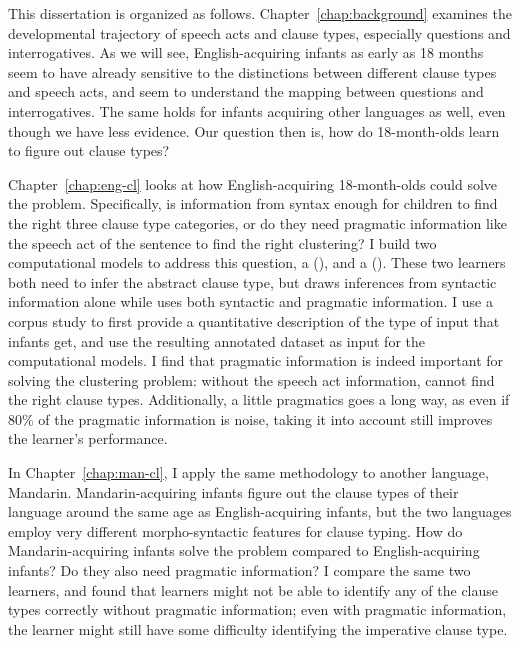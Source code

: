 This dissertation is organized as follows. Chapter~\ref{chap:background} examines the developmental trajectory of speech acts and clause types, especially questions and interrogatives. As we will see, English-acquiring infants as early as 18 months seem to have already sensitive to the distinctions between different clause types and speech acts, and seem to understand the mapping between questions and interrogatives. The same holds for infants acquiring other languages as well, even though we have less evidence. Our question then is, how do 18-month-olds learn to figure out clause types?

Chapter~\ref{chap:eng-cl} looks at how English-acquiring 18-month-olds could solve the problem. Specifically, is information from syntax enough for children to find the right three clause type categories, or do they need pragmatic information like the speech act of the sentence to find the right clustering? I build two computational models to address this question, a \distlearner{} (\dlearnerabbr{}), and a \praglearner{} (\plearnerabbr{}). These two learners both need to infer the abstract clause type, but \dlearnerabbr{} draws inferences from syntactic information alone while \plearnerabbr{} uses both syntactic and pragmatic information. I use a corpus study to first provide a quantitative description of the type of input that infants get, and use the resulting annotated dataset as input for the computational models. I find that pragmatic information is indeed important for solving the clustering problem: without the speech act information, \dlearnerabbr{} cannot find the right clause types. Additionally, a little pragmatics goes a long way, as even if 80\% of the pragmatic information is noise, taking it into account still improves the learner's performance. 

In Chapter~\ref{chap:man-cl}, I apply the same methodology to another language, Mandarin. Mandarin-acquiring infants figure out the clause types of their language around the same age as English-acquiring infants, but the two languages employ very different morpho-syntactic features for clause typing. How do Mandarin-acquiring infants solve the problem compared to English-acquiring infants? Do they also need pragmatic information? I compare the same two learners, and found that learners might not be able to identify any of the clause types correctly without pragmatic information; even with pragmatic information, the learner might still have some difficulty identifying the imperative clause type.

